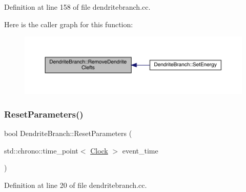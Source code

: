 Definition at line 158 of file dendritebranch.\+cc.

Here is the caller graph for this function\+:
\nopagebreak
\begin{figure}[H]
\begin{center}
\leavevmode
\includegraphics[width=350pt]{class_dendrite_branch_acd54003e5acb9abda7d7a42f248c14b0_icgraph}
\end{center}
\end{figure}
\mbox{\label{class_dendrite_branch_a70b5e63fc44166ccd7f0c7177660c250}} 
\subsubsection{\texorpdfstring{Reset\+Parameters()}{ResetParameters()}}
{\footnotesize\ttfamily bool Dendrite\+Branch\+::\+Reset\+Parameters (\begin{DoxyParamCaption}\item[{std\+::chrono\+::time\+\_\+point$<$ \hyperlink{universe_8h_a0ef8d951d1ca5ab3cfaf7ab4c7a6fd80}{Clock} $>$}]{event\+\_\+time }\end{DoxyParamCaption})}



Definition at line 20 of file dendritebranch.\+cc.

